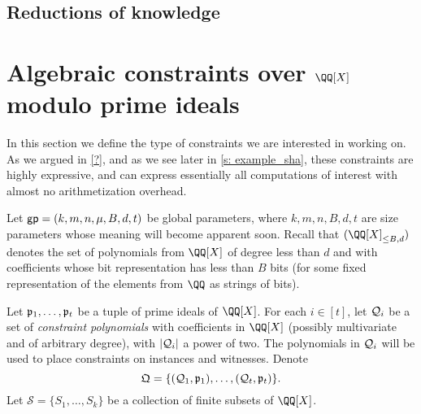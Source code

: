 \documentclass[11pt,letterpaper,usenames,dvipsnames]{article}
\begin{document}
\subsection{Reductions of knowledge}

\section{Algebraic constraints over $\QQ[X]$ modulo prime ideals}

In this section we define the type of constraints we are interested in working on. As we argued in \cref{?}, and as we see later in \cref{s: example_sha}, these constraints are highly expressive, and can  express essentially all computations of interest with almost no arithmetization overhead.

\newcommand{\evalconstraints}{\text{\emph{Eval}}}
\newcommand{\mainQpolyring}{(\QQ[X]_{\leq B, d})}
\newcommand{\mainQpolyringmultilin}{(\QQ[X]_{\leq B, d})^{\multilin}}



%

\newcommand{\megaQ}{\mathfrak{Q}}
\renewcommand{\ff}{\mathbf{f}}
\newcommand{\cS}{\mathcal{S}}
\newcommand{\gpunrolled}{(k, m, n, \mu, B, d, t)}

Let $\gp = \gpunrolled$ be global parameters, where $k,m,n,B,d,t$ are size parameters whose meaning will become apparent soon. Recall that $\mainQpolyring$ denotes the set of polynomials from $\QQ[X]$ of degree less than $d$ and with coefficients whose bit representation has less than $B$ bits (for some fixed representation of the elements from $\QQ$ as strings of bits). 

Let $\mathfrak{p}_1,\ldots, \mathfrak{p}_t$ be a tuple of prime ideals of $\QQ[X]$. For each $i \in [t]$, let $\mathcal{Q}_i$ be a set  of \emph{constraint polynomials} with coefficients in $\QQ[X]$ (possibly multivariate and of arbitrary degree), with $|\mathcal{Q}_i|$ a power of two.  The polynomials in $\mathcal{Q}_i$ will be used to place constraints on instances and witnesses.
Denote 
%
$$
\megaQ = \{(\cQ_1, \primeideal_1), \ldots, (\cQ_t, \primeideal_t)\}.
$$
%
Let $\cS=\{S_1, \ldots, S_k\}$ be a collection of finite subsets of $\QQ[X]$.
%
\end{document}

